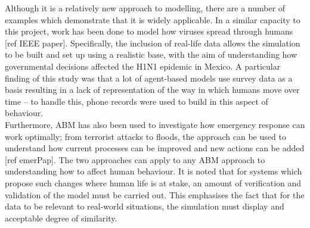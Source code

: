\documentclass[]{report}
\begin{document}
Although it is a relatively new approach to modelling, there are a number of examples which demonstrate that it is widely applicable. In a similar capacity to this project, work has been done to model how viruses spread through humans [ref IEEE paper]. Specifically, the inclusion of real-life data allows the simulation to be built and set up using a realistic base, with the aim of understanding how governmental decisions affected the H1N1 epidemic in Mexico. A particular finding of this study was that a lot of agent-based models use survey data as a basis resulting in a lack of representation of the way in which humans move over time – to handle this, phone records were used to build in this aspect of behaviour. \\
Furthermore, ABM has also been used to investigate how emergency response can work optimally; from terrorist attacks to floods, the approach can be used to understand how current processes can be improved and new actions can be added [ref emerPap]. The two approaches can apply to any ABM approach to understanding how to affect human behaviour. It is noted that for systems which propose such changes where human life is at stake, an amount of verification and validation of the model must be carried out. This emphasises the fact that for the data to be relevant to real-world situations, the simulation must display and acceptable degree of similarity. 
\end{document}
